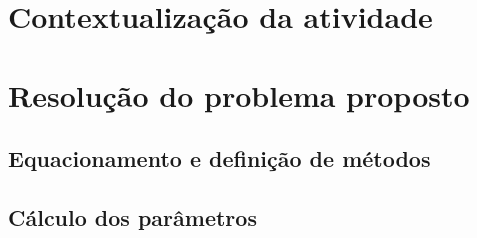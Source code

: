 \section{Contextualização da atividade}

\section{Resolução do problema proposto}

\subsection{Equacionamento e definição de métodos}

\subsection{Cálculo dos parâmetros}